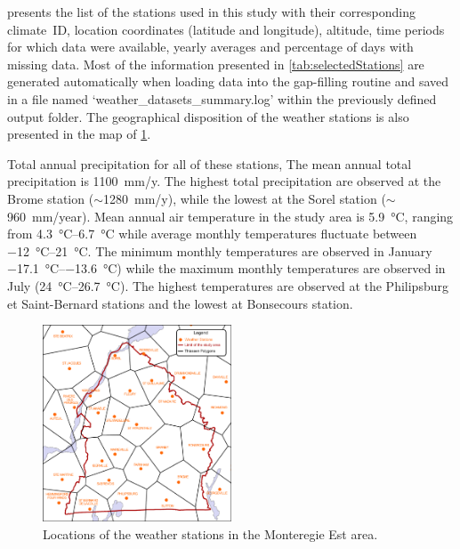 \documentclass[TechnicalNoteMeteo.tex]{subfiles}
\begin{document}
 presents the list of the stations used in this study with their corresponding climate~ID, location coordinates (latitude and longitude), altitude, time periods for which data were available, yearly averages and percentage of days with missing data. Most of the information presented in \cref{tab:selectedStations} are generated automatically when loading data into the gap-filling routine and saved in a file named `weather\_datasets\_summary.log' within the previously defined output folder. The geographical disposition of the weather stations is also presented in the map of \cref{fig:Thiessen_meteo}.



Total annual precipitation for all of these stations, The mean annual total precipitation is \SI{1100}{mm/y}. The highest total precipitation are observed at the Brome station ($\sim$\SI{1280}{mm/y}), while the lowest at the Sorel station ($\sim$\SI{960}{mm/year}). Mean annual air temperature in the study area is \SI{5.9}{\celsius}, ranging from \SIrange{4.3}{6.7}{\celsius} while average monthly temperatures fluctuate between \SIrange{-12}{21}{\celsius}. The minimum monthly temperatures are observed in January \SIrange{-17.1}{-13.6}{\celsius}) while the maximum monthly temperatures are observed in July (\SIrange{24}{26.7}{\celsius}).
The highest temperatures are observed at the Philipsburg et Saint-Bernard stations and the lowest at Bonsecours station.

\begin{figure}[bh!]
    \centering
    \includegraphics[width=0.5\textwidth]{img/Thiessen_meteo}
    \caption[Locations of the weather stations in the Monteregie Est area.]{Locations of the weather stations in the Monteregie Est area.}
    \label{fig:Thiessen_meteo}
\end{figure}
\end{document}

